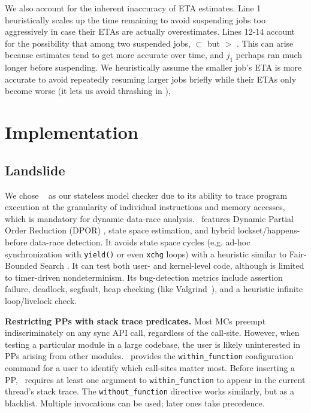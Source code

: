 %
We also account for the inherent inaccuracy of ETA estimates.
Line 1 heuristically scales up the time remaining to avoid suspending jobs too aggressively
in case their ETAs are actually overestimates.
Lines 12-14 account for the
possibility that among two suspended jobs,
 $\subset$ 
but
 $>$ .
This can arise because estimates tend to get more accurate over time,
and $j_1$ perhaps ran much longer before suspending.
We heuristically assume the smaller job's ETA is more accurate
to avoid repeatedly resuming larger jobs briefly while their ETAs only become worse
(it lets us avoid thrashing in \quicksand),


\section{Implementation}

\subsection{Landslide}
\label{sec:landslide}

We chose \landslide~\cite{landslide} as our stateless model checker due to its ability to trace program execution at the granularity of individual instructions and memory accesses, which is mandatory for dynamic data-race analysis.
\landslide~features Dynamic Partial Order Reduction (DPOR) \cite{dpor}, state space estimation, and hybrid lockset/happens-before data-race detection.
It avoids state space cycles (e.g. ad-hoc synchronization with {\tt yield()} or even {\tt xchg} loops) with a heuristic similar to Fair-Bounded Search \cite{bpor}. %
It can test both user- and kernel-level code, although is limited to timer-driven nondeterminism.
Its bug-detection metrics include assertion failure, deadlock, segfault, heap checking (like Valgrind~\cite{valgrind}), and a heuristic infinite loop/livelock check.

{\bf Restricting PPs with stack trace predicates.}
Most MCs preempt indiscriminately on any sync API call, regardless of the call-site.
However, when testing a particular module in a large codebase,
the user is likely uninterested in PPs arising from other modules.
\landslide~provides the {\tt within\_function} configuration command for a user to identify which call-sites matter most.
Before inserting a PP, \landslide~requires at least one argument to {\tt within\_function} to appear in the current thread's stack trace.
The {\tt without\_function} directive works similarly, but as a blacklist.
Multiple invocations can be used; later ones take precedence.

